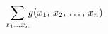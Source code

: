 \documentclass[preview]{standalone}
\begin{document}
\begin{align*}
\special{dvisvgm:raw <g id='unique000'>}\sum_{x_1\ldots x_n}\!\! g(x_1,\,x_2,\,\ldots,\,x_n)\special{dvisvgm:raw </g>}
\end{align*}
\end{document}
